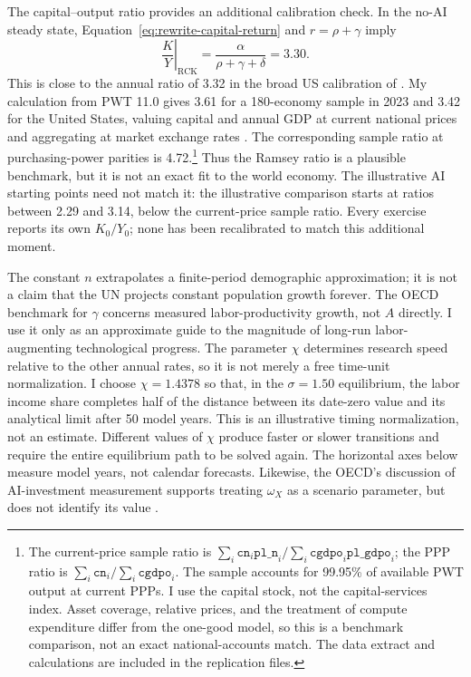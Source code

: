 The capital--output ratio provides an additional calibration check. In the
no-AI steady state, Equation~\eqref{eq:rewrite-capital-return} and
$r=\rho+\gamma$ imply
\begin{equation}
 \left.\frac{K}{Y}\right|_{\mathrm{RCK}}
 =\frac{\alpha}{\rho+\gamma+\delta}=3.30.
 \label{eq:rewrite-ramsey-capital-output}
\end{equation}
This is close to the annual ratio of 3.32 in the broad US calibration of
\citet{cooleyprescott1995}. My calculation from PWT 11.0 gives 3.61 for a
180-economy sample in 2023 and 3.42 for the United States, valuing capital and
annual GDP at current national prices and aggregating at market exchange
rates \citep{feenstrainklaartimmer2015,pwt110}. The corresponding sample ratio
at purchasing-power parities is 4.72.\footnote{The current-price sample ratio
is $\sum_i\mathtt{cn}_i\mathtt{pl\_n}_i/
\sum_i\mathtt{cgdpo}_i\mathtt{pl\_gdpo}_i$; the PPP ratio is
$\sum_i\mathtt{cn}_i/\sum_i\mathtt{cgdpo}_i$. The sample accounts for 99.95\%
of available PWT output at current PPPs. I use the capital stock, not the
capital-services index. Asset coverage, relative prices, and the treatment
of compute expenditure differ from the one-good model, so this is a
benchmark comparison, not an exact national-accounts match. The data extract
and calculations are included in the replication files.}
Thus the Ramsey ratio is a plausible benchmark, but it is not an exact fit
to the world economy. The illustrative AI starting points need not match it:
the illustrative comparison starts at ratios between 2.29 and 3.14, below the
current-price sample ratio. Every exercise reports its own $K_0/Y_0$; none
has been recalibrated to match this additional moment.

The constant $n$ extrapolates a finite-period demographic approximation; it
is not a claim that the UN projects constant population growth forever.
The OECD benchmark for $\gamma$ concerns measured labor-productivity growth,
not $A$ directly. I use it only as an approximate guide to the magnitude of
long-run labor-augmenting technological progress.
The parameter $\chi$ determines research speed relative to the other annual
rates, so it is not merely a free time-unit normalization. I choose
$\chi=1.4378$ so that, in the $\sigma=1.50$ equilibrium, the labor income share
completes half of the distance between its date-zero value and its analytical
limit after 50 model years. This is an illustrative timing normalization, not
an estimate. Different values of $\chi$ produce faster or slower transitions
and require the entire equilibrium path to be solved again. The horizontal
axes below measure model years, not calendar forecasts. Likewise, the OECD's
discussion of AI-investment measurement supports treating $\omega_X$ as a
scenario parameter, but does not identify its value
\citep{oecdaiinvestment2025,oecdproductivity2026}.

